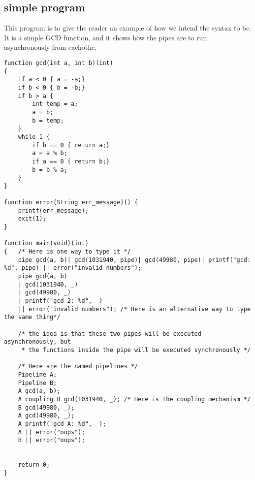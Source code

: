 \documentclass[11pt]{article}
\begin{document}
\subsection{simple program}
This program is to give the reader an example of how we intend the syntax to be. It is a simple GCD function, and it shows how the pipes are to run asynchronously from eachothe.
\begin{lstlisting}
function gcd(int a, int b)(int)
{
	if a < 0 { a = -a;}
	if b < 0 { b = -b;}
	if b > a {
		int temp = a;
		a = b;
		b = temp;
	}
	while 1 {
		if b == 0 { return a;}
		a = a % b;
		if a == 0 { return b;}
		b = b % a;
	}
}

function error(String err_message)() {
	printf(err_message);
	exit(1);
}

function main(void)(int)
{	/* Here is one way to type it */
	pipe gcd(a, b)| gcd(1031940, pipe)| gcd(49980, pipe)| printf("gcd: %d", pipe) || error("invalid numbers");	
	pipe gcd(a, b)
	| gcd(1031940, _)
	| gcd(49980, _)
	| printf("gcd_2: %d", _)
	|| error("invalid numbers"); /* Here is an alternative way to type the same thing*/

	/* the idea is that these two pipes will be executed asynchronously, but
	 * the functions inside the pipe will be executed synchronously */
	
	/* Here are the named pipelines */
	Pipeline A;
	Pipeline B;
	A gcd(a, b);
	A coupling B gcd(1031940, _); /* Here is the coupling mechanism */
	B gcd(49980, _);
	A gcd(49980, _);
	A printf("gcd_A: %d", _);
	A || error("oops");
	B || error("oops");
	
	 
	return 0;
}

\end{lstlisting}
\end{document}
